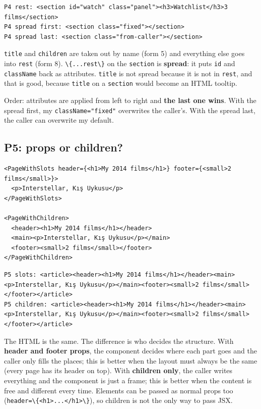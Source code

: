 \documentclass[
]{article}
\newcommand{\passthrough}[1]{#1}
\begin{document}
\begin{lstlisting}
P4 rest: <section id="watch" class="panel"><h3>Watchlist</h3>3 films</section>
P4 spread first: <section class="fixed"></section>
P4 spread last: <section class="from-caller"></section>
\end{lstlisting}

\passthrough{\lstinline!title!} and \passthrough{\lstinline!children!}
are taken out by name (form 5) and everything else goes into
\passthrough{\lstinline!rest!} (form 8).
\passthrough{\lstinline!\{...rest\}!} on the
\passthrough{\lstinline!section!} is \textbf{spread}: it puts
\passthrough{\lstinline!id!} and \passthrough{\lstinline!className!}
back as attributes. \passthrough{\lstinline!title!} is not spread
because it is not in \passthrough{\lstinline!rest!}, and that is good,
because \passthrough{\lstinline!title!} on a
\passthrough{\lstinline!section!} would become an HTML tooltip.

Order: attributes are applied from left to right and \textbf{the last
one wins}. With the spread first, my
\passthrough{\lstinline!className="fixed"!} overwrites the caller's.
With the spread last, the caller can overwrite my default.

\hypertarget{p5-props-or-children}{%
\subsection{P5: props or children?}\label{p5-props-or-children}}

\begin{lstlisting}
<PageWithSlots header={<h1>My 2014 films</h1>} footer={<small>2 films</small>}>
  <p>Interstellar, Kış Uykusu</p>
</PageWithSlots>

<PageWithChildren>
  <header><h1>My 2014 films</h1></header>
  <main><p>Interstellar, Kış Uykusu</p></main>
  <footer><small>2 films</small></footer>
</PageWithChildren>
\end{lstlisting}

\begin{lstlisting}
P5 slots: <article><header><h1>My 2014 films</h1></header><main><p>Interstellar, Kış Uykusu</p></main><footer><small>2 films</small></footer></article>
P5 children: <article><header><h1>My 2014 films</h1></header><main><p>Interstellar, Kış Uykusu</p></main><footer><small>2 films</small></footer></article>
\end{lstlisting}

The HTML is the same. The difference is who decides the structure. With
\textbf{header and footer props}, the component decides where each part
goes and the caller only fills the places; this is better when the
layout must always be the same (every page has its header on top). With
\textbf{children only}, the caller writes everything and the component
is just a frame; this is better when the content is free and different
every time. Elements can be passed as normal props too
(\passthrough{\lstinline!header=\{<h1>...</h1>\}!}), so children is not
the only way to pass JSX.
\end{document}
